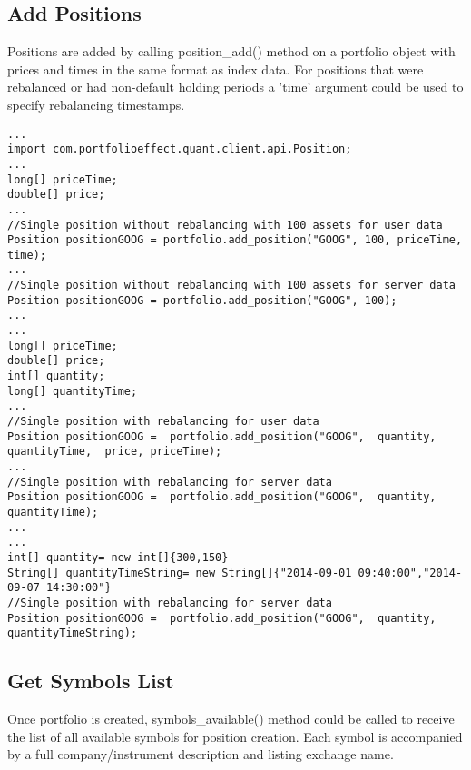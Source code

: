 \documentclass[letterpaper]{report}
\begin{document}
\subsection {Add Positions}
Positions are added by calling
position\_add() method on a portfolio object
with prices and times  in the same format as index data.
For positions that were rebalanced or had non-default holding periods a 'time' argument could be used to specify rebalancing timestamps.
\begin{lstlisting}
...
import com.portfolioeffect.quant.client.api.Position;
...
long[] priceTime;
double[] price;
...
//Single position without rebalancing with 100 assets for user data
Position positionGOOG = portfolio.add_position("GOOG", 100, priceTime, time);
...
//Single position without rebalancing with 100 assets for server data
Position positionGOOG = portfolio.add_position("GOOG", 100);
...
...
long[] priceTime;
double[] price;
int[] quantity;
long[] quantityTime;
...
//Single position with rebalancing for user data
Position positionGOOG =  portfolio.add_position("GOOG",  quantity,  quantityTime,  price, priceTime);
...
//Single position with rebalancing for server data
Position positionGOOG =  portfolio.add_position("GOOG",  quantity,  quantityTime);
...
...
int[] quantity= new int[]{300,150}
String[] quantityTimeString= new String[]{"2014-09-01 09:40:00","2014-09-07 14:30:00"}
//Single position with rebalancing for server data
Position positionGOOG =  portfolio.add_position("GOOG",  quantity,  quantityTimeString);
\end{lstlisting}


\subsection {Get Symbols List}
Once portfolio is created, 
symbols\_available()
method could be called to receive the list of all available symbols for position creation. 
Each symbol is accompanied by a full company/instrument description and listing exchange name.
\end{document}
